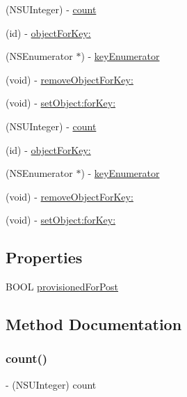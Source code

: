 \begin{DoxyCompactItemize}
(N\+S\+U\+Integer) -\/ \hyperlink{protocolFBGraphObject-p_aaf8c8d696ae643db005f3562ab51fca1}{count}
\item 
(id) -\/ \hyperlink{protocolFBGraphObject-p_a2ca53cdc300a46e5cdbfe0a2ae705f45}{object\+For\+Key\+:}
\item 
(N\+S\+Enumerator $\ast$) -\/ \hyperlink{protocolFBGraphObject-p_a8df88c6df762bb207cea390c8ef5d048}{key\+Enumerator}
\item 
(void) -\/ \hyperlink{protocolFBGraphObject-p_ae70776266993262a70b438421f1e0209}{remove\+Object\+For\+Key\+:}
\item 
(void) -\/ \hyperlink{protocolFBGraphObject-p_a9b7573bc6e372ff8f4f33c3d144ea620}{set\+Object\+:for\+Key\+:}
\item 
(N\+S\+U\+Integer) -\/ \hyperlink{protocolFBGraphObject-p_aaf8c8d696ae643db005f3562ab51fca1}{count}
\item 
(id) -\/ \hyperlink{protocolFBGraphObject-p_a2ca53cdc300a46e5cdbfe0a2ae705f45}{object\+For\+Key\+:}
\item 
(N\+S\+Enumerator $\ast$) -\/ \hyperlink{protocolFBGraphObject-p_a8df88c6df762bb207cea390c8ef5d048}{key\+Enumerator}
\item 
(void) -\/ \hyperlink{protocolFBGraphObject-p_ae70776266993262a70b438421f1e0209}{remove\+Object\+For\+Key\+:}
\item 
(void) -\/ \hyperlink{protocolFBGraphObject-p_a9b7573bc6e372ff8f4f33c3d144ea620}{set\+Object\+:for\+Key\+:}
\end{DoxyCompactItemize}
\subsection*{Properties}
\begin{DoxyCompactItemize}
\item 
B\+O\+OL \hyperlink{protocolFBGraphObject-p_a0f1fd42624dd3d7a43588df67ae1e6a8}{provisioned\+For\+Post}
\end{DoxyCompactItemize}


\subsection{Method Documentation}
\mbox{\label{protocolFBGraphObject-p_aaf8c8d696ae643db005f3562ab51fca1}} 
\subsubsection{\texorpdfstring{count()}{count()}\hspace{0.1cm}{\footnotesize\ttfamily [1/5]}}
{\footnotesize\ttfamily -\/ (N\+S\+U\+Integer) count \begin{DoxyParamCaption}{ }\end{DoxyParamCaption}}

